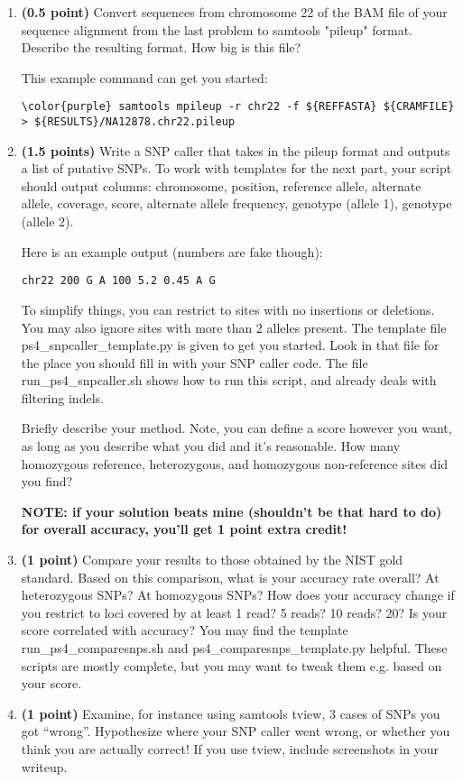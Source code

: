 \documentclass[12pt]{article}
\begin{document}
\begin{enumerate}
\item \textbf{(0.5 point)} Convert sequences from chromosome 22 of the BAM file of your sequence alignment from the last problem to samtools "pileup" format. Describe the resulting format. How big is this file?

This example command can get you started:
\begin{Verbatim}[commandchars=\\\{\}]
\color{purple} samtools mpileup -r chr22 -f ${REFFASTA} ${CRAMFILE} > ${RESULTS}/NA12878.chr22.pileup
\end{Verbatim}

\item \textbf{(1.5 points)} Write a SNP caller that takes in the pileup format and outputs a list of putative SNPs. 
To work with templates for the next part, your script should output columns: chromosome, position, reference allele, alternate allele, coverage, score, alternate allele frequency, genotype (allele 1), genotype (allele 2).

Here is an example output (numbers are fake though):
\begin{Verbatim}[commandchars=\\\{\}]
chr22 200 G A 100 5.2 0.45 A G
\end{Verbatim}

To simplify things, you can restrict to sites with no insertions or deletions. You may also ignore sites with more than 2 alleles present. The template file ps4\_snpcaller\_template.py is given to get you started. Look in that file for the place you should fill in with your SNP caller code. The file run\_ps4\_snpcaller.sh shows how to run this script, and already deals with filtering indels.

Briefly describe your method. Note, you can define a score however you want, as long as you describe what you did and it's reasonable. How many homozygous reference, heterozygous, and homozygous non-reference sites did you find?

\textbf{NOTE: if your solution beats mine (shouldn't be that hard to do) for overall accuracy, you'll get 1 point extra credit!}

\item \textbf{(1 point)} Compare your results to those obtained by the NIST gold standard. Based on this comparison, what is your accuracy rate overall? At heterozygous SNPs? At homozygous SNPs? How does your accuracy change if you restrict to loci covered by at least 1 read? 5 reads? 10 reads? 20? Is your score correlated with accuracy? You may find the template run\_ps4\_comparesnps.sh and ps4\_comparesnps\_template.py helpful. These scripts are mostly complete, but you may want to tweak them e.g. based on your score.

\item \textbf{(1 point)} Examine, for instance using samtools tview, 3 cases of SNPs you got ``wrong''. Hypothesize where your SNP caller went wrong, or whether you think you are actually correct! If you use tview, include screenshots in your writeup.

\end{enumerate}
\end{document}

